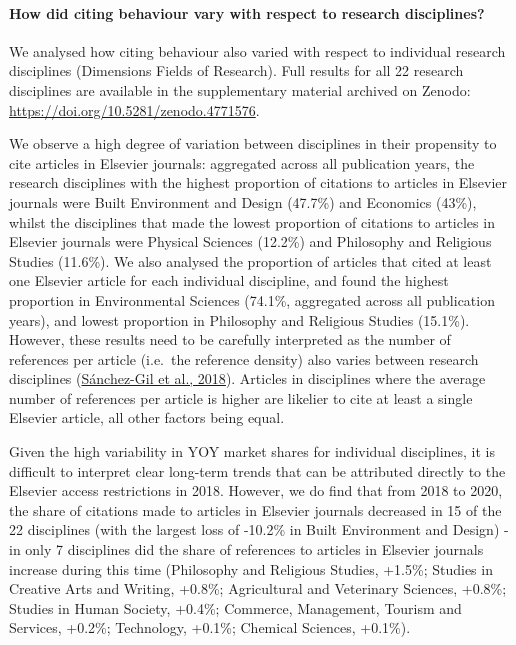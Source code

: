 \documentclass[
]{article}
\begin{document}
\hypertarget{how-did-citing-behaviour-vary-with-respect-to-research-disciplines}{%
\paragraph{How did citing behaviour vary with respect to research disciplines?}\label{how-did-citing-behaviour-vary-with-respect-to-research-disciplines}}

We analysed how citing behaviour also varied with respect to individual research disciplines (Dimensions Fields of Research). Full results for all 22 research disciplines are available in the supplementary material archived on Zenodo: \url{https://doi.org/10.5281/zenodo.4771576}.

We observe a high degree of variation between disciplines in their propensity to cite articles in Elsevier journals: aggregated across all publication years, the research disciplines with the highest proportion of citations to articles in Elsevier journals were Built Environment and Design (47.7\%) and Economics (43\%), whilst the disciplines that made the lowest proportion of citations to articles in Elsevier journals were Physical Sciences (12.2\%) and Philosophy and Religious Studies (11.6\%). We also analysed the proportion of articles that cited at least one Elsevier article for each individual discipline, and found the highest proportion in Environmental Sciences (74.1\%, aggregated across all publication years), and lowest proportion in Philosophy and Religious Studies (15.1\%). However, these results need to be carefully interpreted as the number of references per article (i.e.~the reference density) also varies between research disciplines (\href{https://doi.org/10.1016/j.joi.2017.11.003}{Sánchez-Gil et al., 2018}). Articles in disciplines where the average number of references per article is higher are likelier to cite at least a single Elsevier article, all other factors being equal.

Given the high variability in YOY market shares for individual disciplines, it is difficult to interpret clear long-term trends that can be attributed directly to the Elsevier access restrictions in 2018. However, we do find that from 2018 to 2020, the share of citations made to articles in Elsevier journals decreased in 15 of the 22 disciplines (with the largest loss of -10.2\% in Built Environment and Design) - in only 7 disciplines did the share of references to articles in Elsevier journals increase during this time (Philosophy and Religious Studies, +1.5\%; Studies in Creative Arts and Writing, +0.8\%; Agricultural and Veterinary Sciences, +0.8\%; Studies in Human Society, +0.4\%; Commerce, Management, Tourism and Services, +0.2\%; Technology, +0.1\%; Chemical Sciences, +0.1\%).
\end{document}
